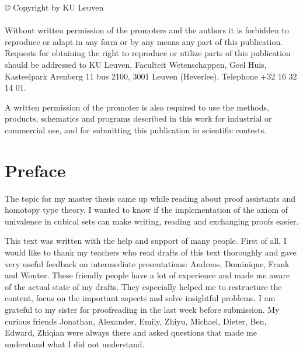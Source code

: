 \documentclass[12pt,a4paper,twoside,xetex]{book} %
\begin{document}
\rmfamily



\thispagestyle{empty}



\null

\vfill

\begin{footnotesize}
© Copyright by KU Leuven \\ \\

Without written permission of the promoters and the authors it is forbidden to reproduce or adapt in any form or by any means any part of this publication. Requests for obtaining the right to reproduce or utilize parts of this publication should be addressed to KU Leuven, Faculteit Wetenschappen, Geel Huis, Kasteelpark Arenberg 11 bus 2100, 3001 Leuven (Heverlee), Telephone +32 16 32 14 01.

A written permission of the promoter is also required to use the methods, products, schematics and programs described in this work for industrial or commercial use, and for submitting this publication in scientific contests.
\end{footnotesize}


\clearpage 

\clearpage

\setcounter{page}{0}

\setsansfont{CMU Sans Serif}  

\chapter*{Preface}

The topic for my master thesis came up while reading about proof assistants and homotopy type theory. I wanted to know if the implementation of the axiom of 
univalence in cubical sets can make writing, reading and exchanging proofs easier. 

This text was written with the help and support of many people. First of all, I 
would like to thank my teachers who read drafts of this text thoroughly and gave 
very useful feedback on intermediate presentations: Andreas, Dominique, Frank and Wouter. These friendly people have a lot of experience and made me aware of the actual state of my drafts. They especially helped me to restructure the content, focus on the important aspects and solve insightful problems. I am grateful to my sister for proofreading in the last week before submission. My curious friends Jonathan, Alexander, Emily, Zhiyu, Michael, Dieter, Ben, Edward, Zhiqian were always there and asked questions that made me understand what I did not understand.
\\
\end{document}
